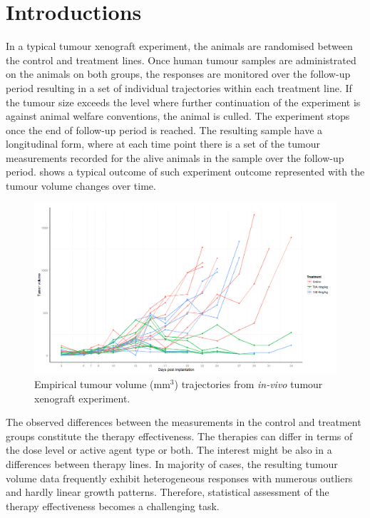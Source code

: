 \section{Introductions}
In a typical tumour xenograft experiment, the animals are randomised between the control and treatment lines.
Once human tumour samples are administrated on the animals on both groups, the responses are monitored over the follow-up period resulting in a set of individual trajectories within each treatment line.
If the tumour size exceeds the level where further continuation of the experiment is against animal welfare conventions, the animal is culled.
The experiment stops once the end of follow-up period is reached.
The resulting sample have a longitudinal form, where at each time point there is a set of the tumour measurements recorded for the alive animals in the sample over the follow-up period.
 shows a typical outcome of such experiment outcome represented with the tumour volume changes over time.

\begin{figure}
	\centering
	\includegraphics[width=\textwidth]{xenograph/figures/raw_trajectories.png}
	\caption{Empirical tumour volume (mm$^3$) trajectories from \emph{in-vivo} tumour xenograft experiment.}
	\label{raw_trajectories}
\end{figure}

The observed differences between the measurements in the control and treatment groups constitute the therapy effectiveness.
The therapies can differ in terms of the dose level or active agent type or both.
The interest might be also in a differences between therapy lines.
In majority of cases, the resulting tumour volume data frequently exhibit heterogeneous responses with numerous outliers and hardly linear growth patterns.
Therefore, statistical assessment of the therapy effectiveness becomes a challenging task.

